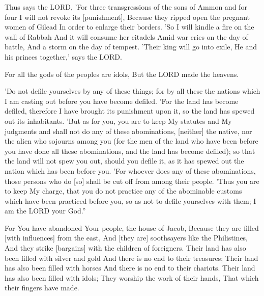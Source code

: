 \begin{scripture}[Amos 1:13-15]
    Thus says the LORD, 'For three transgressions of the sons of Ammon and for four I will not revoke its [punishment], Because they ripped open the pregnant women of Gilead In order to enlarge their borders.
    'So I will kindle a fire on the wall of Rabbah And it will consume her citadels Amid war cries on the day of battle, And a storm on the day of tempest.
    'Their king will go into exile, He and his princes together,' says the LORD.
\end{scripture}

\begin{scripture}[Psalm 96:5]
    For all the gods of the peoples are idols, But the LORD made the heavens.
\end{scripture}

\begin{scripture}[Leviticus 18:24-30]
    'Do not defile yourselves by any of these things; for by all these the nations which I am casting out before you have become defiled.
    'For the land has become defiled, therefore I have brought its punishment upon it, so the land has spewed out its inhabitants.
    'But as for you, you are to keep My statutes and My judgments and shall not do any of these abominations, [neither] the native, nor the alien who sojourns among you
    (for the men of the land who have been before you have done all these abominations, and the land has become defiled);
    so that the land will not spew you out, should you defile it, as it has spewed out the nation which has been before you.
    'For whoever does any of these abominations, those persons who do [so] shall be cut off from among their people.
    'Thus you are to keep My charge, that you do not practice any of the abominable customs which have been practiced before you, so as not to defile yourselves with them; I am the LORD your God.''
\end{scripture}

\begin{scripture}[Isaiah 2:6-8]
    For You have abandoned Your people, the house of Jacob, Because they are filled [with influences] from the east, And [they are] soothsayers like the Philistines, And they strike [bargains] with the children of foreigners.
    Their land has also been filled with silver and gold And there is no end to their treasures; Their land has also been filled with horses And there is no end to their chariots.
    Their land has also been filled with idols; They worship the work of their hands, That which their fingers have made.
\end{scripture}

